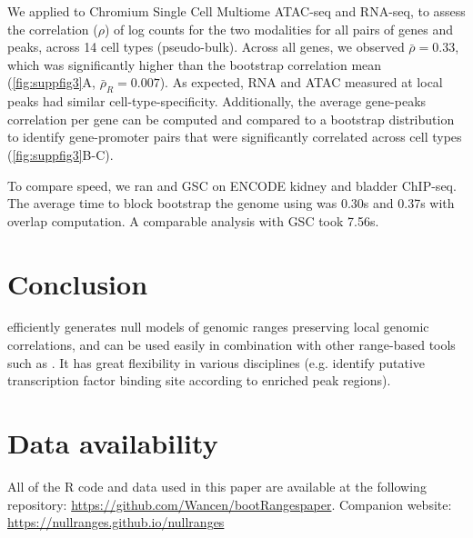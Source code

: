 
We applied \bootranges to
Chromium Single Cell Multiome
ATAC-seq and RNA-seq, to assess the correlation ($\rho$) of log counts for the two
modalities for all pairs of genes and peaks, across
14 cell types (pseudo-bulk). Across all genes, we observed
$\bar{\rho} = 0.33$, which was 
significantly higher than the bootstrap correlation mean
(\cref{fig:suppfig3}A, $\bar{\rho}_{R} = 0.007$). As expected, RNA
and ATAC measured at local peaks had similar cell-type-specificity.
Additionally, the average gene-peaks correlation per gene can be
computed and compared to a bootstrap distribution to
identify gene-promoter pairs that were significantly correlated across
cell types (\cref{fig:suppfig3}B-C).


To compare speed, we ran \bootranges and GSC on
ENCODE kidney and bladder ChIP-seq. The average time to
block bootstrap the genome using \bootranges was 0.30s and
0.37s with overlap computation. A comparable analysis with GSC took
7.56s.


\section{Conclusion}

\bootranges efficiently generates null models of genomic ranges preserving 
local genomic correlations, and can be used easily in combination with
other range-based tools such as \plyranges.
It has great flexibility in various disciplines (e.g. identify
putative transcription factor binding site according to enriched peak
regions).

\section*{Data availability}
 All of the R code and data used in this paper are available at the
 following repository: 
 \url{https://github.com/Wancen/bootRangespaper}.
Companion website: \url{https://nullranges.github.io/nullranges}


